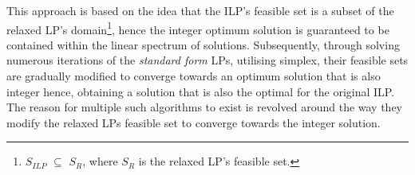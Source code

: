 \vspace{\baselineskip}
\noindent
This approach is based on the idea that the ILP’s feasible set is a subset of the relaxed LP’s domain\footnote{$S_{ILP}$ $\subseteq$ $S_{R}$, where $S_{R}$ is the relaxed LP's feasible set.}, hence the integer optimum solution is guaranteed to be contained within the linear spectrum of solutions. Subsequently, through solving numerous iterations of the \textit{standard form} LPs, utilising simplex, their feasible sets are gradually modified to converge towards an optimum solution that is also integer hence, obtaining a solution that is also the optimal for the original ILP. The reason for multiple such algorithms to exist is revolved around the way they modify the relaxed LPs feasible set to converge towards the integer solution. \par



